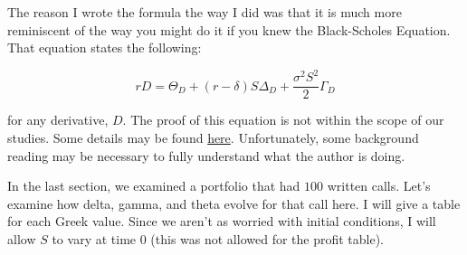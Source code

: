 \documentclass{ximera}
\begin{document}
The reason I wrote the formula the way I did was that it is much more reminiscent of the way you might do it if you knew the Black-Scholes Equation. That equation states the following:

\begin{equation*}
rD=\Theta_D+(r-\delta)S\Delta_D+\frac{\sigma^2S^2}{2}\Gamma_D
\end{equation*}

for any derivative, $D$. The proof of this equation is not within the scope of our studies. Some details may be found \href{https://www.math.cuhk.edu.hk/~rchan/teaching/math4210/chap08.pdf}{here}. Unfortunately, some background reading may be necessary to fully understand what the author is doing.

In the last section, we examined a portfolio that had $100$ written calls. Let's examine how delta, gamma, and theta evolve for that call here. I will give a table for each Greek value. Since we aren't as worried with initial conditions, I will allow $S$ to vary at time 0 (this was not allowed for the profit table). 
\end{document}

